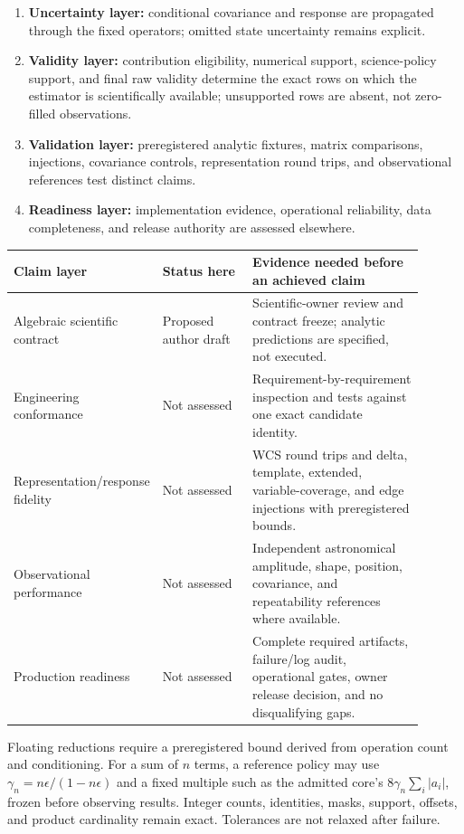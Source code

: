 \documentclass[10pt]{article}
\newcommand{\ClaimNo}{\textcolor{MapGray}{Not assessed}}
\begin{document}
\begin{enumerate}
\item \textbf{Uncertainty layer:} conditional covariance and response are
propagated through the fixed operators; omitted state uncertainty remains
explicit.
\item \textbf{Validity layer:} contribution eligibility, numerical support,
science-policy support, and final raw validity determine the exact rows on
which the estimator is scientifically available; unsupported rows are absent,
not zero-filled observations.
\item \textbf{Validation layer:} preregistered analytic fixtures, matrix
comparisons, injections, covariance controls, representation round trips, and
observational references test distinct claims.
\item \textbf{Readiness layer:} implementation evidence, operational
reliability, data completeness, and release authority are assessed elsewhere.
\end{enumerate}

\begin{longtable}{L{0.26\linewidth}L{0.22\linewidth}L{0.42\linewidth}}
\toprule
Claim layer & Status here & Evidence needed before an achieved claim\\
\midrule
Algebraic scientific contract & Proposed author draft & Scientific-owner
review and contract freeze; analytic predictions are specified, not executed.\\
Engineering conformance & \ClaimNo & Requirement-by-requirement inspection and
tests against one exact candidate identity.\\
Representation/response fidelity & \ClaimNo & WCS round trips and delta,
template, extended, variable-coverage, and edge injections with preregistered
bounds.\\
Observational performance & \ClaimNo & Independent astronomical amplitude,
shape, position, covariance, and repeatability references where available.\\
Production readiness & \ClaimNo & Complete required artifacts, failure/log
audit, operational gates, owner release decision, and no disqualifying gaps.\\
\bottomrule
\end{longtable}

Floating reductions require a preregistered bound derived from operation count
and conditioning. For a sum of \(n\) terms, a reference policy may use
\(\gamma_n=n\epsilon/(1-n\epsilon)\) and a fixed multiple such as the admitted
core's \(8\gamma_n\sum_i|a_i|\), frozen before observing results. Integer
counts, identities, masks, support, offsets, and product cardinality remain
exact. Tolerances are not relaxed after failure.
\end{document}
